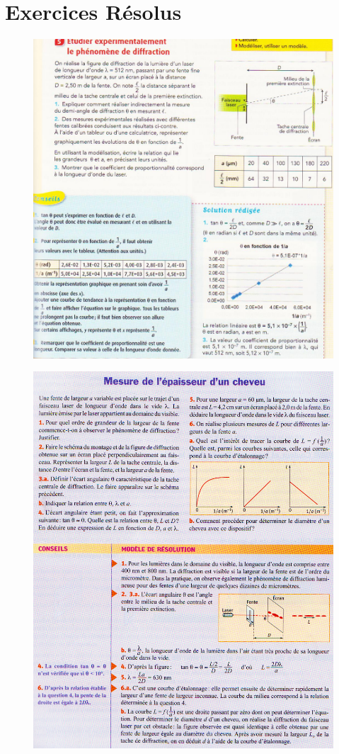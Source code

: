 \documentclass[11pt,a4paper]{article}
\begin{document}
\section{Exercices Résolus}	
\begin{figure}[H]
    \centering
    \includegraphics[width=\linewidth]{imgs/p5/exoDIFF.jpg}
\end{figure}
\begin{figure}[H]
    \centering
    \includegraphics[width=\linewidth]{imgs/p5/exoCHEVEU.jpg}
\end{figure}
\end{document}

